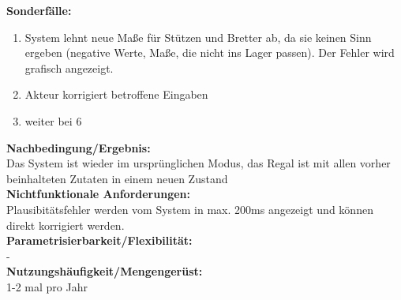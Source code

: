\textbf{Sonderfälle:}
\begin{enumerate}
\item System lehnt neue Maße für Stützen und Bretter ab, da sie keinen Sinn ergeben (negative Werte, Maße, die nicht ins Lager passen). Der Fehler wird grafisch angezeigt.
\item Akteur korrigiert betroffene Eingaben
\item weiter bei 6
\end{enumerate}
\textbf{Nachbedingung/Ergebnis:}\\
Das System ist wieder im ursprünglichen Modus, das Regal ist mit allen vorher beinhalteten Zutaten in einem neuen Zustand\\
\textbf{Nichtfunktionale Anforderungen:}\\
Plausibitätsfehler werden vom System in max. 200ms angezeigt und können direkt korrigiert werden.\\
\textbf{Parametrisierbarkeit/Flexibilität:}\\
-\\
\textbf{Nutzungshäufigkeit/Mengengerüst:}\\
1-2 mal pro Jahr